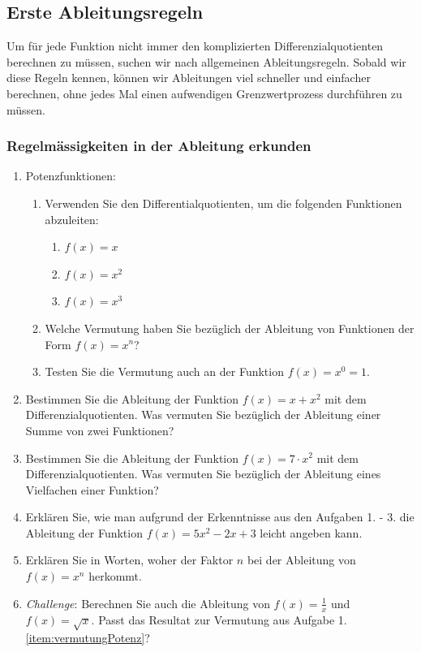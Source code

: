 \subsection{Erste Ableitungsregeln}
Um für jede Funktion nicht immer den komplizierten Differenzialquotienten berechnen zu müssen, suchen wir nach allgemeinen Ableitungsregeln. Sobald wir diese Regeln kennen, können wir Ableitungen viel schneller und einfacher berechnen, ohne jedes Mal einen aufwendigen Grenzwertprozess durchführen zu müssen.

\subsubsection{Regelmässigkeiten in der Ableitung erkunden}
\begin{enumerate}
    \item Potenzfunktionen:
          \begin{enumerate}
              \item Verwenden Sie den Differentialquotienten, um die folgenden Funktionen abzuleiten:
                    \begin{enumerate}
                        \item $f(x)=x$
                        \item $f(x)=x^2$
                        \item $f(x)=x^3$
                    \end{enumerate}
              \item Welche Vermutung haben Sie bezüglich der Ableitung von Funktionen der Form $f(x)=x^n$? \label{item:vermutungPotenz}
              \item Testen Sie die Vermutung auch an der Funktion $f(x)=x^0=1$.
          \end{enumerate}
    \item  Bestimmen Sie die Ableitung der Funktion $f(x)=x+x^2$ mit dem Differenzialquotienten. Was vermuten Sie bezüglich der Ableitung einer Summe von zwei Funktionen?
    \item Bestimmen Sie die Ableitung der Funktion $f(x)=7\cdot x^2$ mit dem Differenzialquotienten. Was vermuten Sie bezüglich der Ableitung eines Vielfachen einer Funktion?
    \item  Erklären Sie, wie man aufgrund der Erkenntnisse aus den Aufgaben 1. - 3. die Ableitung der Funktion $f(x)=5x^2-2x+3$ leicht angeben kann.
    \item Erklären Sie in Worten, woher der Faktor $n$ bei der Ableitung von $f(x)=x^n$ herkommt.
    \item \emph{Challenge}: Berechnen Sie auch die Ableitung von $f(x)=\frac{1}{x}$ und $f(x)=\sqrt{x}$. Passt das Resultat zur Vermutung aus Aufgabe 1. \ref{item:vermutungPotenz}?
\end{enumerate}
